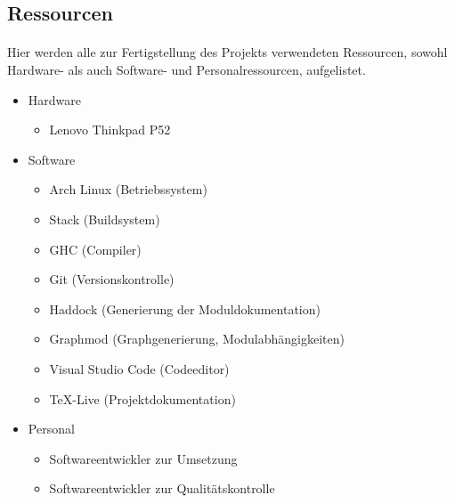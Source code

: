 \subsection{Ressourcen}
\paragraph{}
Hier werden alle zur Fertigstellung des Projekts verwendeten Ressourcen, sowohl
Hardware- als auch Software- und Personalressourcen, aufgelistet.

\begin{itemize}
    \item Hardware \begin{itemize}
              \item Lenovo Thinkpad P52
          \end{itemize}
    \item Software \begin{itemize}
              \item Arch Linux (Betriebssystem)
              \item Stack (Buildsystem)
              \item GHC (Compiler)
              \item Git (Versionskontrolle)
              \item Haddock (Generierung der Moduldokumentation)
              \item Graphmod (Graphgenerierung, Modulabhängigkeiten)
              \item Visual Studio Code (Codeeditor)
              \item \TeX -Live (Projektdokumentation)
          \end{itemize}
    \item Personal \begin{itemize}
              \item Softwareentwickler zur Umsetzung
              \item Softwareentwickler zur Qualitätskontrolle
          \end{itemize}
\end{itemize}